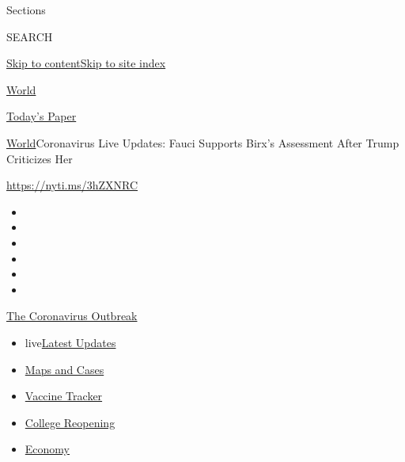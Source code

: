 Sections

SEARCH

\protect\hyperlink{site-content}{Skip to
content}\protect\hyperlink{site-index}{Skip to site index}

\href{https://www.nytimes3xbfgragh.onion/section/world}{World}

\href{https://myaccount.nytimes3xbfgragh.onion/auth/login?response_type=cookie\&client_id=vi}{}

\href{https://www.nytimes3xbfgragh.onion/section/todayspaper}{Today's
Paper}

\href{/section/world}{World}\textbar{}Coronavirus Live Updates: Fauci
Supports Birx's Assessment After Trump Criticizes Her

\url{https://nyti.ms/3hZXNRC}

\begin{itemize}
\item
\item
\item
\item
\item
\item
\end{itemize}

\href{https://www.nytimes3xbfgragh.onion/news-event/coronavirus?action=click\&pgtype=Article\&state=default\&region=TOP_BANNER\&context=storylines_menu}{The
Coronavirus Outbreak}

\begin{itemize}
\tightlist
\item
  live\href{https://www.nytimes3xbfgragh.onion/2020/08/03/world/coronavirus-covid-19.html?action=click\&pgtype=Article\&state=default\&region=TOP_BANNER\&context=storylines_menu}{Latest
  Updates}
\item
  \href{https://www.nytimes3xbfgragh.onion/interactive/2020/us/coronavirus-us-cases.html?action=click\&pgtype=Article\&state=default\&region=TOP_BANNER\&context=storylines_menu}{Maps
  and Cases}
\item
  \href{https://www.nytimes3xbfgragh.onion/interactive/2020/science/coronavirus-vaccine-tracker.html?action=click\&pgtype=Article\&state=default\&region=TOP_BANNER\&context=storylines_menu}{Vaccine
  Tracker}
\item
  \href{https://www.nytimes3xbfgragh.onion/2020/08/02/us/covid-college-reopening.html?action=click\&pgtype=Article\&state=default\&region=TOP_BANNER\&context=storylines_menu}{College
  Reopening}
\item
  \href{https://www.nytimes3xbfgragh.onion/live/2020/08/03/business/stock-market-today-coronavirus?action=click\&pgtype=Article\&state=default\&region=TOP_BANNER\&context=storylines_menu}{Economy}
\end{itemize}

